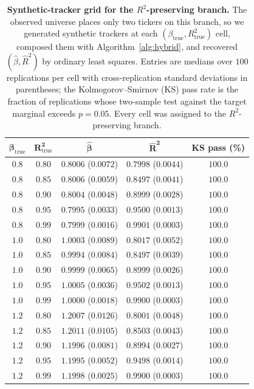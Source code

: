 \begin{table}[tbp]
\centering
\caption{\textbf{Synthetic-tracker grid for the $R^2$-preserving
    branch.} The observed universe places only two tickers on this
    branch, so we generated synthetic trackers at each
    $(\beta_{\mathrm{true}}, R^2_{\mathrm{true}})$ cell, composed them
    with Algorithm~\ref{alg:hybrid}, and recovered
    $(\hat\beta, \hat R^2)$ by ordinary least squares. Entries are
    medians over $100$ replications per cell with cross-replication
    standard deviations in parentheses; the Kolmogorov--Smirnov (KS)
    pass rate is the fraction of replications whose two-sample test
    against the target marginal exceeds $p = 0.05$. Every cell was
    assigned to the $R^2$-preserving branch.}
\label{tab:tracker_grid}
\small
\begin{tabular}{@{}ccccc@{}}
\toprule
$\boldsymbol{\beta_{\mathrm{true}}}$ &
$\boldsymbol{R^2_{\mathrm{true}}}$ &
$\boldsymbol{\hat\beta}$ & $\boldsymbol{\hat R^2}$ &
\textbf{KS pass (\%)} \\ \midrule
$0.8$ & $0.80$ & $0.8006$ ($0.0072$) & $0.7998$ ($0.0044$) & $100.0$ \\
$0.8$ & $0.85$ & $0.8006$ ($0.0059$) & $0.8497$ ($0.0041$) & $100.0$ \\
$0.8$ & $0.90$ & $0.8004$ ($0.0048$) & $0.8999$ ($0.0028$) & $100.0$ \\
$0.8$ & $0.95$ & $0.7995$ ($0.0033$) & $0.9500$ ($0.0013$) & $100.0$ \\
$0.8$ & $0.99$ & $0.7999$ ($0.0016$) & $0.9901$ ($0.0003$) & $100.0$ \\ \midrule
$1.0$ & $0.80$ & $1.0003$ ($0.0089$) & $0.8017$ ($0.0052$) & $100.0$ \\
$1.0$ & $0.85$ & $0.9994$ ($0.0084$) & $0.8497$ ($0.0039$) & $100.0$ \\
$1.0$ & $0.90$ & $0.9999$ ($0.0065$) & $0.8999$ ($0.0026$) & $100.0$ \\
$1.0$ & $0.95$ & $1.0005$ ($0.0036$) & $0.9502$ ($0.0013$) & $100.0$ \\
$1.0$ & $0.99$ & $1.0000$ ($0.0018$) & $0.9900$ ($0.0003$) & $100.0$ \\ \midrule
$1.2$ & $0.80$ & $1.2007$ ($0.0126$) & $0.8001$ ($0.0048$) & $100.0$ \\
$1.2$ & $0.85$ & $1.2011$ ($0.0105$) & $0.8503$ ($0.0043$) & $100.0$ \\
$1.2$ & $0.90$ & $1.1996$ ($0.0081$) & $0.8994$ ($0.0027$) & $100.0$ \\
$1.2$ & $0.95$ & $1.1995$ ($0.0052$) & $0.9498$ ($0.0014$) & $100.0$ \\
$1.2$ & $0.99$ & $1.1998$ ($0.0025$) & $0.9900$ ($0.0003$) & $100.0$ \\
\bottomrule
\end{tabular}
\end{table}

